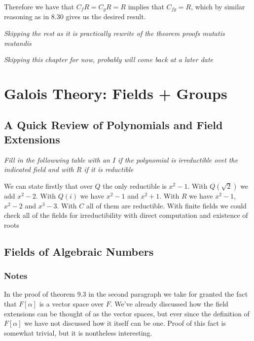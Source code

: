 \documentclass[11pt,oneside,titlepage]{book}
\begin{document}
Therefore we have that $C_f R = C_g R = R$ implies that $C_{fg} = R$,
which by similar reasoning as in 8.30 gives us the desired result.

\textit{Skipping the rest as it is practically rewrite of the theorem
  proofs mutatis mutandis}

\textit{Skipping this chapter for now, probably will come back at a
  later date}


\chapter{Galois Theory: Fields + Groups}

\section{A Quick Review of Polynomials and Field Extensions}

\textit{Fill in the followwing table with an $I$ if the polynomial is
  irreductible ovet the indicated field and with $R$ if it is reductible}

We can state firstly that over $Q$ the only reductible is $x^2 -
1$. With $Q(\sqrt{2})$ we add $x^2 - 2$. With $Q(i)$ we have $x^2 - 1$
and $x^2 + 1$. With $R$ we have $x^2 - 1$, $x^2 - 2$ and $x^3 -
3$. With $C$ all of them are reductible. With finite fields we could
check all of the fields for irreductibility with direct computation
and existence of roots

\section{Fields of Algebraic Numbers}

\subsection*{Notes}

In the proof of theorem 9.3 in the second paragraph we take for
granted the fact that $F[\alpha]$ is a vector space over $F$. We've
already discussed how the field extensions can be thought of as the
vector spaces, but ever since the definition of $F[\alpha]$ we have
not discussed how it itself can be one. Proof of this fact is somewhat
trivial, but it is nontheless interesting.
\end{document}
